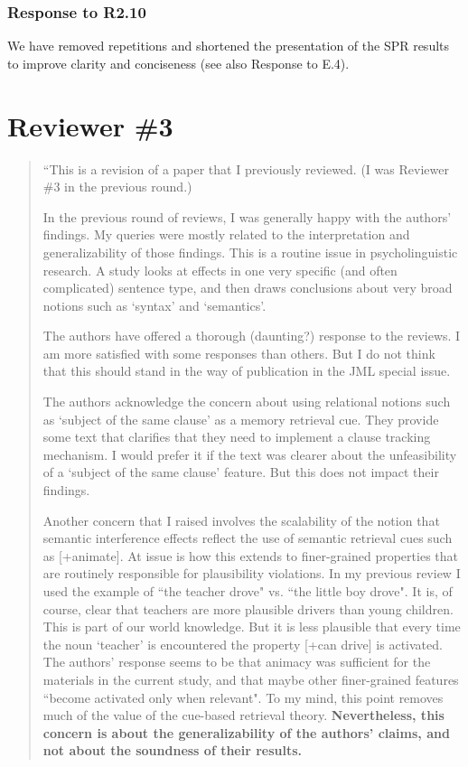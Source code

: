 \documentclass[12pt]{article}
\begin{document}
\subsubsection*{Response to R2.10}
We have removed repetitions and shortened the presentation of the SPR results to improve clarity and conciseness (see also Response to E.4).


\section*{Reviewer \#3} 

\begin{quote}
``This is a revision of a paper that I previously reviewed. (I was Reviewer \#3 in the previous round.)

In the previous round of reviews, I was generally happy with the authors' findings. My queries were mostly related to the interpretation and generalizability of those findings. This is a routine issue in psycholinguistic research. A study looks at effects in one very specific (and often complicated) sentence type, and then draws conclusions about very broad notions such as `syntax' and `semantics'.

The authors have offered a thorough (daunting?) response to the reviews. I am more satisfied with some responses than others. But I do not think that this should stand in the way of publication in the JML special issue.

The authors acknowledge the concern about using relational notions such as `subject of the same clause' as a memory retrieval cue. They provide some text that clarifies that they need to implement a clause tracking mechanism. I would prefer it if the text was clearer about the unfeasibility of a `subject of the same clause' feature. But this does not impact their findings.

Another concern that I raised involves the scalability of the notion that semantic interference effects reflect the use of semantic retrieval cues such as [+animate]. At issue is how this extends to finer-grained properties that are routinely responsible for plausibility violations. In my previous review I used the example of ``the teacher drove" vs. ``the little boy drove". It is, of course, clear that teachers are more plausible drivers than young children. This is part of our world knowledge. But it is less plausible that every time the noun `teacher' is encountered the property [+can drive] is activated. The authors' response seems to be that animacy was sufficient for the materials in the current study, and that maybe other finer-grained features ``become activated only when relevant". To my mind, this point removes much of the value of the cue-based retrieval theory. \textbf{Nevertheless, this concern is about the generalizability of the authors' claims, and not about the soundness of their results.}


\end{quote}
\end{document}

